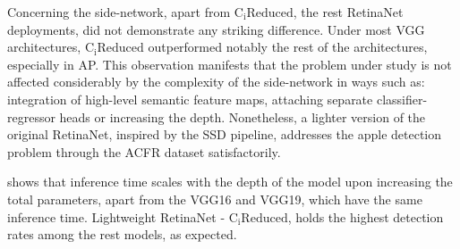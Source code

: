 Concerning the side-network, apart from $\text{C}_\text{i}\text{Reduced}$, the rest RetinaNet deployments, did not demonstrate any striking difference. Under most VGG architectures, $\text{C}_\text{i}\text{Reduced}$ outperformed notably the rest of the architectures, especially in AP. This observation manifests that the problem under study is not affected considerably by the complexity of the side-network in ways such as: integration of high-level semantic feature maps, attaching separate classifier-regressor heads or increasing the depth. Nonetheless, a lighter version of the original RetinaNet, inspired by the SSD pipeline, addresses the apple detection problem through the ACFR dataset satisfactorily.

 shows that inference time scales with the depth of the model upon increasing the total parameters, apart from the VGG16 and VGG19, which have the same inference time. Lightweight RetinaNet - $\text{C}_\text{i}\text{Reduced}$, holds the highest detection rates among the rest models, as expected.


\begin{table}[!htb]
  \centering
  \caption{Inference time for every VGG. Detection rates depend heavily on the No. of parameters of the model and the input resolution. However, the transition from VGG16 to VGG19 did not show any change.}
  \label{tab5}
\end{table}

